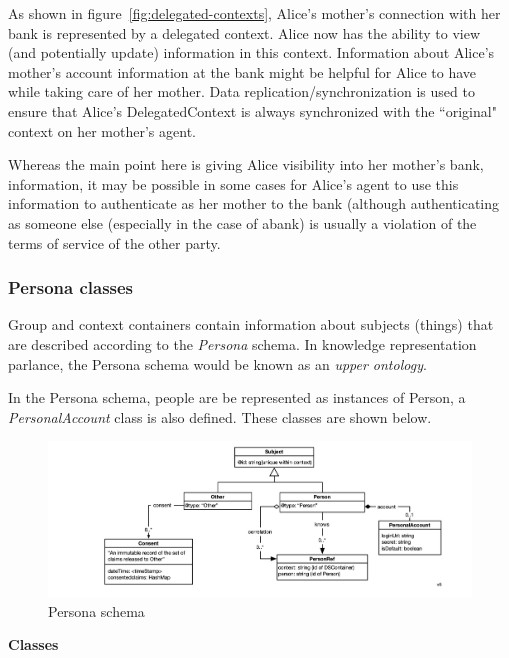 \documentclass[11pt, oneside]{article}   	%
\begin{document}
As shown in figure~\ref{fig:delegated-contexts}, Alice's mother's connection with her bank is represented by a delegated context. Alice now has the ability to view (and potentially update) information in this context. Information about Alice's mother's account information at the bank might be helpful for Alice to have while taking care of her mother. Data replication/synchronization is used to ensure that Alice's DelegatedContext is always synchronized with the ``original" context on her mother's agent.

Whereas the main point here is giving Alice visibility into her mother's bank, information, it may be possible in some cases for Alice's agent to use this information to authenticate as her mother to the bank (although authenticating as someone else (especially in the case of abank) is usually a violation of the terms of service of the other party.

\subsubsection{Persona classes}

Group and context containers contain information about subjects (things) that are described according to the \emph{Persona} schema. In knowledge representation parlance, the Persona schema would be known as an \emph{upper ontology}.

In the Persona schema, people are be represented as instances of Person, a \emph{PersonalAccount} class is also defined. These classes are shown below. 

\begin{figure}[htbp]
\includegraphics[width=\textwidth]{./images/persona-classes.png}
\caption{Persona schema}
\end{figure}

\textbf{Classes}
\end{document}

